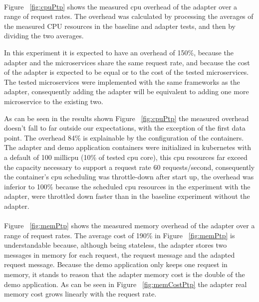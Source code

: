 \paragraph{}

Figure ~\ref{fig:cpuPtp} shows the measured cpu overhead of the adapter over a
range of request rates.
The overhead was calculated by processing the averages of the measured CPU resources in the baseline and adapter tests, and then by dividing the two averages.

In this experiment it is expected to have an overhead of 150\%, because the adapter and the microservices share the same request rate,
and because the cost of the adapter is expected to be equal or to the cost of the tested microservices.
The tested microservices were implemented with the same frameworks as the adapter, consequently adding the adapter will be equivalent to adding one more microservice to the existing two.

As can be seen in the results shown Figure ~\ref{fig:cpuPtp} the measured overhead doesn't fall to far outside our expectations, with the exception of the first data point.
The overhead 84\% is explainable by the configuration of the containers.
The adapter and demo application containers were initialized in kubernetes with a default of 100 millicpu (10\% of tested cpu core),
this cpu resources far exceed the capacity necessary to support a request rate 60 requests/second,
consequently the container's cpu scheduling was throttle-down after start up,
the overhead was inferior to 100\% because the scheduled cpu resources in the experiment with the adapter, were throttled down faster than in the baseline experiment without the adapter.

\paragraph{}

Figure ~\ref{fig:memPtp} shows the measured memory overhead of the adapter over a
range of request rates.
The average cost of 190\% in Figure ~\ref{fig:memPtp} is understandable because, although being stateless, the adapter stores two messages in memory for each request, the request message and the adapted request message.
Because the demo application only keeps one request in memory, it stands to reason that the adapter memory cost is the double of the demo application.
As can be seen in Figure ~\ref{fig:memCostPtp} the adapter real memory cost grows linearly with the request rate.


